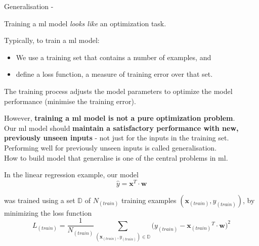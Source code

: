 

\begin{frame}[t,allowframebreaks]{Generalisation -}

    \label{sec:Generalisation}

    Training a \gls{ml} model {\em looks like} an optimization task.\\
    \vspace{0.1cm}
    \begin{blockexample}{}
      Typically, to train a \gls{ml} model: 
      \begin{itemize}
        \item 
        We use a \gls{training set} 
        that contains a number of examples, and
        \item
        define a \gls{loss function},
        a measure of training error over that set.
      \end{itemize}
      The training process adjusts the model parameters
      to optimize the model performance (minimise the training error).\\
    \end{blockexample}
    \vspace{0.2cm}
    However, {\bf training a \gls{ml} model is not a pure optimization problem}.\\
    \vspace{0.2cm}
    Our \gls{ml} model should {\bf maintain a satisfactory performance 
    with new, previously unseen inputs} - 
    not just for the inputs in the training set.\\
    \vspace{0.2cm}
    Performing well for previously unseen inputs is called 
    \gls{generalisation}.\\
    \vspace{0.2cm}
    How to build model that generalise is one of the central problems in \gls{ml}.


    \framebreak


    In the linear regression example, our model
    \begin{equation}
        \hat{y} = {\mathbf x}^T \cdot {\mathbf w}
    \end{equation}        

    was trained using a set $\mathbb{D}$ of $N_{(train)}$
    training examples $({\mathbf x_{(train)}},y_{(train)})$, 
    by minimizing the loss function
    \begin{equation}
        L_{(train)} = \frac{1}{N_{(train)}} 
        \sum_{({\mathbf x_{(train)}},y_{(train)})  \in \mathbb{D}}
        \Big( y_{(train)} - {\mathbf x_{(train)}}^T \cdot {\mathbf w} \Big)^2
    \end{equation}        


\end{frame}
